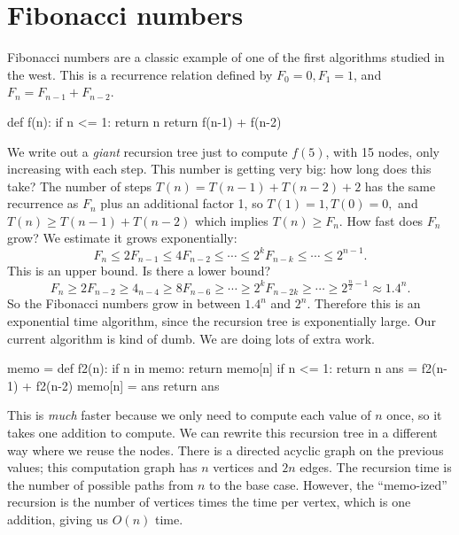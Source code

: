 \section{Fibonacci numbers} 
Fibonacci numbers are a classic example of one of the first algorithms studied in the west. This is a recurrence relation defined by $F_0=0,F_1=1$, and $F_n =F_{n-1}+F_{n-2}$.
\begin{python}
   def f(n):
    if n <= 1: return n
    return f(n-1) + f(n-2)
\end{python}
We write out a \emph{giant} recursion tree just to compute $f(5)$, with 15 nodes, only increasing with each step. This number is getting very big: how long does this take? The number of steps $T(n)=T(n-1)+T(n-2)+2$ has the same recurrence as $F_n $ plus an additional factor 1, so $T(1)=1,T(0)=0,$ and $T(n) \geq T(n-1)+T(n-2)$ which implies $T(n) \geq F_n $. How fast does $F_n $ grow? We estimate it grows exponentially: \[
F_n  \leq 2 F_{n-1}\leq 4 F_{n-2} \leq \cdots \leq 2^k F_{n-k} \leq \cdots  \leq 2^{n-1}.
\] This is an upper bound. Is there a lower bound? \[
F_n  \geq 2 F_{n-2}\geq 4_{n-4}\geq 8 F_{n-6} \geq \cdots  \geq 2^k F_{n-2k}\geq \cdots  \geq2 ^{\frac{n}{2}-1}\approx 1.4^n.
\] So the Fibonacci numbers grow in between $1.4^n $ and $2^n $. Therefore this is an exponential time algorithm, since the recursion tree is exponentially large. Our current algorithm is kind of dumb. We are doing lots of extra work.
\begin{python}
memo = {}
def f2(n):
    if n in memo: return memo[n]
    if n <= 1: return n
    ans = f2(n-1) + f2(n-2)
    memo[n] = ans
    return ans
\end{python}
This is \emph{much} faster because we only need to compute each value of $n$ once, so it takes one addition to compute. We can rewrite this recursion tree in a different way where we reuse the nodes. There is a directed acyclic graph on the previous values; this computation graph has $n$ vertices and $2n$ edges. The recursion time is the number of possible paths from $n$ to the base case. However, the ``memo-ized'' recursion is the number of vertices times the time per vertex, which is one addition, giving us $O(n)$ time.

